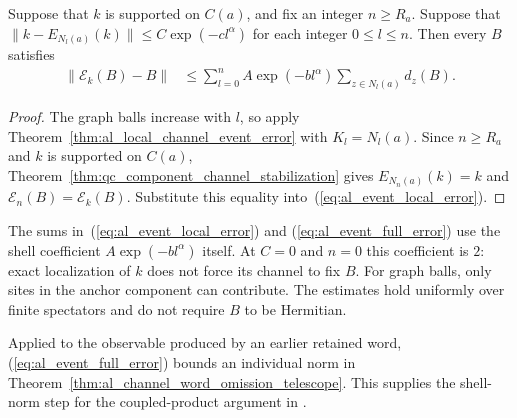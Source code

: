 \begin{theorem}
    \label{thm:al_graph_channel_event_error}
    \leanok
    Suppose that $k$ is supported on $C(a)$, and fix an integer
    $n\ge R_a$. Suppose that
    $\|k-E_{N_l(a)}(k)\|\le C\exp(-cl^\alpha)$ for each integer
    $0\le l\le n$. Then every $B$ satisfies
    \begin{align}
        \|\mathcal E_k(B)-B\|
         &\le\sum_{l=0}^n A\exp(-bl^\alpha)
             \sum_{z\in N_l(a)}d_z(B).
        \label{eq:al_event_full_error}
    \end{align}
\end{theorem}
\begin{proof}
    \leanok
    The graph balls increase with $l$, so apply
    Theorem~\ref{thm:al_local_channel_event_error} with $K_l=N_l(a)$.
    Since $n\ge R_a$ and $k$ is supported on $C(a)$,
    Theorem~\ref{thm:qc_component_channel_stabilization} gives
    $E_{N_n(a)}(k)=k$ and $\mathcal E_n(B)=\mathcal E_k(B)$.
    Substitute this equality into~(\ref{eq:al_event_local_error}).
\end{proof}

The sums in~(\ref{eq:al_event_local_error}) and
(\ref{eq:al_event_full_error}) use the shell coefficient
$A\exp(-bl^\alpha)$ itself. At $C=0$ and $n=0$ this coefficient
is $2$: exact localization of $k$ does not force its channel
to fix $B$. For graph balls, only sites in the anchor component
can contribute. The estimates hold uniformly over finite
spectators and do not require $B$ to be Hermitian.

Applied to the observable produced by an earlier retained word,
(\ref{eq:al_event_full_error}) bounds an individual norm in
Theorem~\ref{thm:al_channel_word_omission_telescope}.
This supplies the shell-norm step for the coupled-product
argument in \cite[\texttt{09-amplification.tex},
lines 203--215]{OpenAI2026AreaLaw}.
